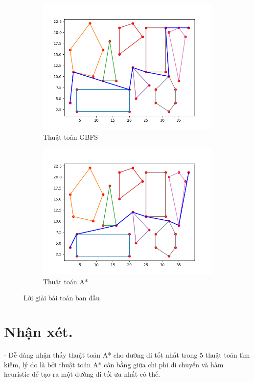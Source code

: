 \documentclass[a4paper, 11pt]{article}
\begin{document}
\begin{figure}[h]
  \bigskip
  \begin{subfigure}{.3\linewidth}
    \centering
    \includegraphics[width=\textwidth,height=\textheight,keepaspectratio]{gbfs.png}
    \caption{Thuật toán GBFS}
  \end{subfigure}
  \hfill
  \begin{subfigure}{.3\linewidth}
    \centering
    \includegraphics[width=\textwidth,height=\textheight,keepaspectratio]{a_star.png}
    \caption{Thuật toán A*}
  \end{subfigure}
  \caption{Lời giải bài toán ban đầu}
\end{figure}

\section{Nhận xét.}
- Dễ dàng nhận thấy thuật toán A* cho đường đi tốt nhất trong 5 thuật toán tìm kiếm, lý do là bởi thuật toán A* cân bằng giữa chi phí di chuyển và hàm heuristic để tạo ra một đường đi tối ưu nhất có thể.
\end{document}
